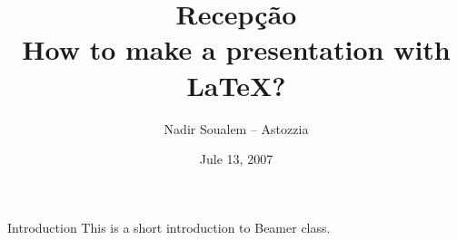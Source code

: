 \documentclass{beamer}
\title[Make a LaTeX presentation using Beamer]{Recepção\\How to make a presentation with LaTeX?}
\author{Nadir Soualem -- Astozzia}
\institute{Math-linux.com}
\date{Jule 13, 2007}
\begin{document}
\begin{frame}
\titlepage
\end{frame}


\begin{frame}{Introduction}
This is a short introduction to Beamer class.
\end{frame}
\end{document}
